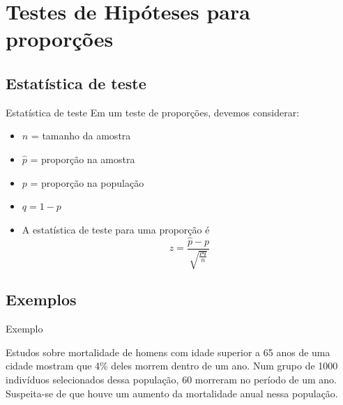 \documentclass{beamer}
\begin{document}
\section{Testes de Hipóteses para proporções}

\subsection{Estatística de teste}

\begin{frame}{Estatística de teste}
  Em um teste de proporções, devemos considerar:
  \begin{itemize}
  \item $n$ = tamanho da amostra
  \item $\hat{p}$ = proporção na amostra
  \item $p$ = proporção na população
  \item $q=1-p$
  \item A estatística de teste para uma proporção é
    \begin{displaymath}
      z = \frac{\hat{p} - p}{\sqrt{\frac{pq}{n}}}
    \end{displaymath}
  \end{itemize}
\end{frame}

\subsection{Exemplos}

\begin{frame}{Exemplo}
  \begin{example}
    Estudos sobre mortalidade de homens com idade superior a 65 anos
    de uma cidade mostram que 4\% deles morrem dentro de um ano. Num
    grupo de 1000 indivíduos selecionados dessa população, 60 morreram
    no período de um ano. Suspeita-se de que houve um aumento da
    mortalidade anual nessa população.
  \end{example}
\end{frame}
\end{document}

